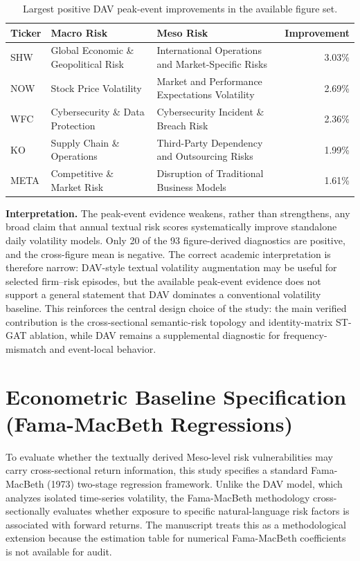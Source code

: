 \documentclass[11pt, a4paper]{article}
\begin{document}
\begin{table}[H]
\centering
\caption{Largest positive DAV peak-event improvements in the available figure set.}
\label{tab:dav_peak_top_positive}
\vspace{0.2cm}
\renewcommand{\arraystretch}{1.12}
\small
\begin{tabularx}{\textwidth}{@{}L{1.5cm}Y Y r@{}}
\toprule
\textbf{Ticker} & \textbf{Macro Risk} & \textbf{Meso Risk} & \textbf{Improvement} \\
\midrule
SHW & Global Economic \& Geopolitical Risk & International Operations and Market-Specific Risks & 3.03\% \\
NOW & Stock Price Volatility & Market and Performance Expectations Volatility & 2.69\% \\
WFC & Cybersecurity \& Data Protection & Cybersecurity Incident \& Breach Risk & 2.36\% \\
KO & Supply Chain \& Operations & Third-Party Dependency and Outsourcing Risks & 1.99\% \\
META & Competitive \& Market Risk & Disruption of Traditional Business Models & 1.61\% \\
\bottomrule
\end{tabularx}
\end{table}

\textbf{Interpretation.} The peak-event evidence weakens, rather than strengthens, any broad claim that annual textual risk scores systematically improve standalone daily volatility models. Only 20 of the 93 figure-derived diagnostics are positive, and the cross-figure mean is negative. The correct academic interpretation is therefore narrow: DAV-style textual volatility augmentation may be useful for selected firm--risk episodes, but the available peak-event evidence does not support a general statement that DAV dominates a conventional volatility baseline. This reinforces the central design choice of the study: the main verified contribution is the cross-sectional semantic-risk topology and identity-matrix ST-GAT ablation, while DAV remains a supplemental diagnostic for frequency-mismatch and event-local behavior.

\newpage

\section{Econometric Baseline Specification (Fama-MacBeth Regressions)}
To evaluate whether the textually derived Meso-level risk vulnerabilities may carry cross-sectional return information, this study specifies a standard Fama-MacBeth (1973) two-stage regression framework. Unlike the DAV model, which analyzes isolated time-series volatility, the Fama-MacBeth methodology cross-sectionally evaluates whether exposure to specific natural-language risk factors is associated with forward returns. The manuscript treats this as a methodological extension because the estimation table for numerical Fama-MacBeth coefficients is not available for audit.
\end{document}
